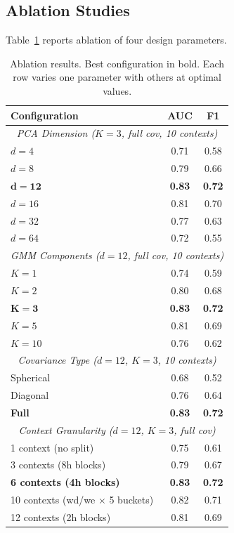 \documentclass[11pt,a4paper]{article}
\begin{document}
\subsection{Ablation Studies}

Table~\ref{tab:ablation} reports ablation of four design parameters.

\begin{table}[H]
\centering
\caption{Ablation results. Best configuration in bold. Each row varies one parameter with others at optimal values.}
\label{tab:ablation}
\begin{tabular}{lcc}
\toprule
\textbf{Configuration} & \textbf{AUC} & \textbf{F1} \\
\midrule
\multicolumn{3}{c}{\textit{PCA Dimension ($K{=}3$, full cov, 10 contexts)}} \\
\midrule
$d=4$   & 0.71 & 0.58 \\
$d=8$   & 0.79 & 0.66 \\
$\mathbf{d=12}$ & \textbf{0.83} & \textbf{0.72} \\
$d=16$  & 0.81 & 0.70 \\
$d=32$  & 0.77 & 0.63 \\
$d=64$  & 0.72 & 0.55 \\
\midrule
\multicolumn{3}{c}{\textit{GMM Components ($d{=}12$, full cov, 10 contexts)}} \\
\midrule
$K=1$   & 0.74 & 0.59 \\
$K=2$   & 0.80 & 0.68 \\
$\mathbf{K=3}$ & \textbf{0.83} & \textbf{0.72} \\
$K=5$   & 0.81 & 0.69 \\
$K=10$  & 0.76 & 0.62 \\
\midrule
\multicolumn{3}{c}{\textit{Covariance Type ($d{=}12$, $K{=}3$, 10 contexts)}} \\
\midrule
Spherical   & 0.68 & 0.52 \\
Diagonal    & 0.76 & 0.64 \\
\textbf{Full} & \textbf{0.83} & \textbf{0.72} \\
\midrule
\multicolumn{3}{c}{\textit{Context Granularity ($d{=}12$, $K{=}3$, full cov)}} \\
\midrule
1 context (no split)    & 0.75 & 0.61 \\
3 contexts (8h blocks)  & 0.79 & 0.67 \\
\textbf{6 contexts (4h blocks)} & \textbf{0.83} & \textbf{0.72} \\
10 contexts (wd/we $\times$ 5 buckets) & 0.82 & 0.71 \\
12 contexts (2h blocks) & 0.81 & 0.69 \\
\bottomrule
\end{tabular}
\end{table}
\end{document}
